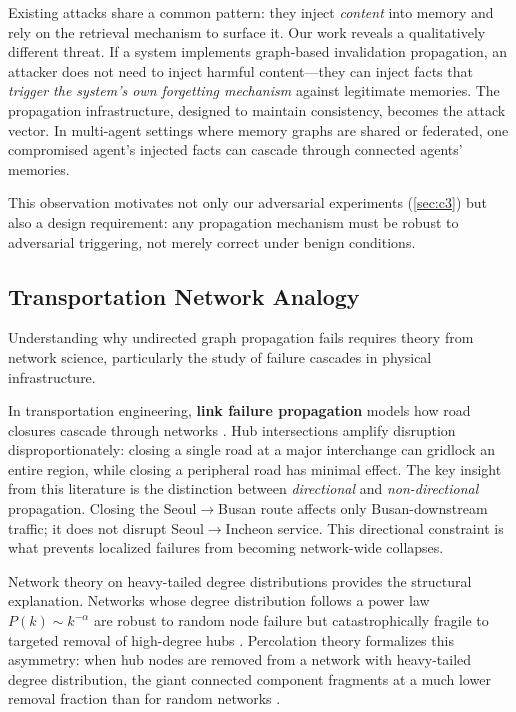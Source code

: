 \documentclass[11pt]{article}
\begin{document}
Existing attacks share a common pattern: they inject \textit{content} into memory and rely on the retrieval mechanism to surface it.
Our work reveals a qualitatively different threat.
If a system implements graph-based invalidation propagation, an attacker does not need to inject harmful content---they can inject facts that \textit{trigger the system's own forgetting mechanism} against legitimate memories.
The propagation infrastructure, designed to maintain consistency, becomes the attack vector.
In multi-agent settings where memory graphs are shared or federated, one compromised agent's injected facts can cascade through connected agents' memories.

This observation motivates not only our adversarial experiments (\cref{sec:c3}) but also a design requirement: any propagation mechanism must be robust to adversarial triggering, not merely correct under benign conditions.

\subsection{Transportation Network Analogy}
\label{sec:bg_transport}

Understanding why undirected graph propagation fails requires theory from network science, particularly the study of failure cascades in physical infrastructure.

In transportation engineering, \textbf{link failure propagation} models how road closures cascade through networks \citep{chen_network_2007, chen_lane_resilience_2024}.
Hub intersections amplify disruption disproportionately: closing a single road at a major interchange can gridlock an entire region, while closing a peripheral road has minimal effect.
The key insight from this literature is the distinction between \textit{directional} and \textit{non-directional} propagation.
Closing the Seoul$\rightarrow$Busan route affects only Busan-downstream traffic; it does not disrupt Seoul$\rightarrow$Incheon service.
This directional constraint is what prevents localized failures from becoming network-wide collapses.

Network theory on heavy-tailed degree distributions provides the structural explanation.
Networks whose degree distribution follows a power law $P(k) \sim k^{-\alpha}$ are robust to random node failure but catastrophically fragile to targeted removal of high-degree hubs \citep{albert_attack_2000, barabasi_scalefree_1999}.
Percolation theory formalizes this asymmetry: when hub nodes are removed from a network with heavy-tailed degree distribution, the giant connected component fragments at a much lower removal fraction than for random networks \citep{cohen_percolation_2000}.
\end{document}

